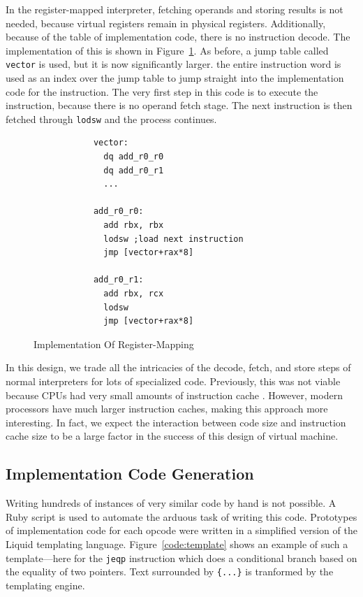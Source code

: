 \documentclass[A4]{sig-alternate}
\begin{document}
In the register-mapped interpreter, fetching operands and storing results is not needed, because virtual registers remain in physical registers. Additionally, because of the table of implementation code, there is no instruction decode. The implementation of this is shown in Figure~\ref{code:registermapped}. As before, a jump table called \texttt{vector} is used, but it is now significantly larger. the entire instruction word is used as an index over the jump table to jump straight into the implementation code for the instruction. The very first step in this code is to execute the instruction, because there is no operand fetch stage. The next instruction is then fetched through \texttt{lodsw} and the process continues.

\begin{figure}
	\begin{center}
		\begin{minipage}[b]{0.8\linewidth}
			\begin{verbatim}
			vector:
			  dq add_r0_r0
			  dq add_r0_r1
			  ...
			
			add_r0_r0:
			  add rbx, rbx
			  lodsw ;load next instruction
			  jmp [vector+rax*8]
			
			add_r0_r1:
			  add rbx, rcx
			  lodsw
			  jmp [vector+rax*8]
			\end{verbatim}
			\caption{Implementation Of Register-Mapping}
			\label{code:registermapped}
		\end{minipage}
	\end{center}
\end{figure}

In this design, we trade all the intricacies of the decode, fetch, and store steps of normal interpreters for lots of specialized code. Previously, this was not viable because CPUs had very small amounts of instruction cache \cite{stackcaching}. However, modern processors have much larger instruction caches, making this approach more interesting. In fact, we expect the interaction between code size and instruction cache size to be a large factor in the success of this design of virtual machine. 

\subsection{Implementation Code Generation}
Writing hundreds of instances of very similar code by hand is not possible. A Ruby script is used to automate the arduous task of writing this code. Prototypes of implementation code for each opcode were written in a simplified version of the Liquid templating language. Figure~\ref{code:template} shows an example of such a template---here for the \texttt{jeqp} instruction which does a conditional branch based on the equality of two pointers. Text surrounded by \texttt{\{...\}} is tranformed by the templating engine.
\end{document}
